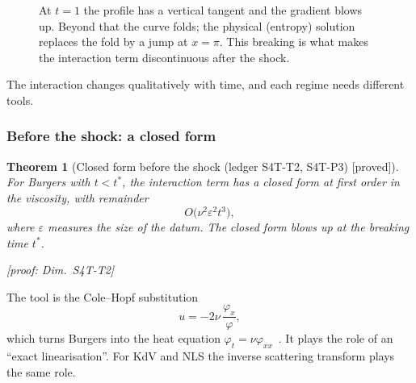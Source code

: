 \documentclass[11pt]{article}
\theoremstyle{plain}
\newtheorem{theorem}{Theorem}[section]
\theoremstyle{definition}
\theoremstyle{remark}
\newcommand{\badge}[2]{\textcolor{#1}{\textsf{\footnotesize[#2]}}}
\newcommand{\proved}[1][]{\badge{cC}{proved#1}}
\newcommand{\led}[1]{\textcolor{cG}{\textsf{\footnotesize(ledger #1)}}}
\newcommand{\dimref}[1]{\textsf{\footnotesize[proof: Dim.~#1]}}
\begin{document}
\begin{figure}[!htb]
\centering
{}
\caption{At $t=1$ the profile has a vertical tangent and the gradient blows up. Beyond that the curve folds; the physical (entropy) solution replaces the fold by a jump at $x=\pi$. This breaking is what makes the interaction term discontinuous after the shock.}\label{f:fig:burgers}
\end{figure}

The interaction changes qualitatively with time, and each regime needs different tools.

\subsubsection{Before the shock: a closed form}

\begin{theorem}[{Closed form before the shock \led{S4T-T2, S4T-P3} \proved}]\label{thm:preshock}
For Burgers with $t<t^*$, the interaction term has a closed form at first order in the viscosity, with remainder
\[
O\big(\nu^2\varepsilon^2t^3\big),
\]
where $\varepsilon$ measures the size of the datum. The closed form blows up at the breaking time $t^*$.

\dimref{S4T-T2}
\end{theorem}

The tool is the Cole--Hopf substitution
\[
u=-2\nu\,\frac{\varphi_x}{\varphi},
\]
which turns Burgers into the heat equation $\varphi_t=\nu\varphi_{xx}$~\cite{ch}. It plays the role of an ``exact linearisation''. For KdV and NLS the inverse scattering transform plays the same role.
\end{document}
